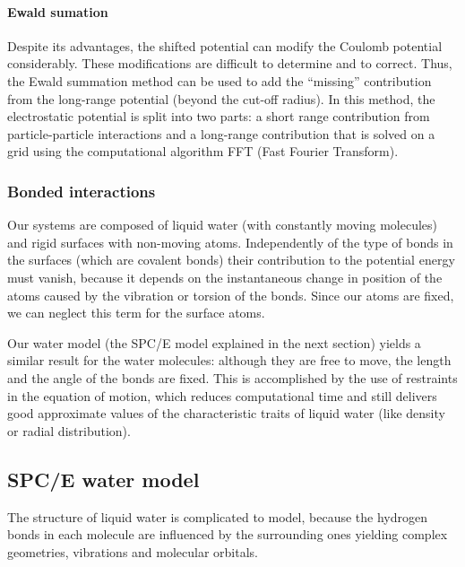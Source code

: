 \paragraph{Ewald sumation}

Despite its advantages, the shifted potential can modify the Coulomb
potential considerably. These modifications are difficult to determine
and to correct. Thus, the Ewald summation method can be used to add
the \textquotedblleft missing\textquotedblright{} contribution from
the long-range potential (beyond the cut-off radius). In this method,
the electrostatic potential is split into two parts: a short range
contribution from particle-particle interactions and a long-range
contribution that is solved on a grid using the computational algorithm
FFT (Fast Fourier Transform).

\subsubsection{Bonded interactions}

Our systems are composed of liquid water (with constantly moving molecules)
and rigid surfaces with non-moving atoms. Independently of the type
of bonds in the surfaces (which are covalent bonds) their contribution
to the potential energy must vanish, because it depends on the instantaneous
change in position of the atoms caused by the vibration or torsion
of the bonds. Since our atoms are fixed, we can neglect this term
for the surface atoms.

Our water model (the SPC/E model explained in the next section) yields
a similar result for the water molecules: although they are free to
move, the length and the angle of the bonds are fixed. This is accomplished
by the use of restraints in the equation of motion, which reduces
computational time and still delivers good approximate values of the
characteristic traits of liquid water (like density or radial distribution).

\subsection{\label{sub:SPCE}SPC/E water model}

The structure of liquid water is complicated to model, because the
hydrogen bonds in each molecule are influenced by the surrounding
ones yielding complex geometries, vibrations and molecular orbitals.

